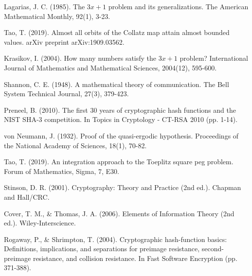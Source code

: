\begin{thebibliography}{99}

 Lagarias, J. C. (1985). The $3x + 1$ problem and its generalizations. The American Mathematical Monthly, 92(1), 3-23.

 Tao, T. (2019). Almost all orbits of the Collatz map attain almost bounded values. arXiv preprint arXiv:1909.03562.

 Krasikov, I. (2004). How many numbers satisfy the $3x + 1$ problem? International Journal of Mathematics and Mathematical Sciences, 2004(12), 595-600.

 Shannon, C. E. (1948). A mathematical theory of communication. The Bell System Technical Journal, 27(3), 379-423.

 Preneel, B. (2010). The first 30 years of cryptographic hash functions and the NIST SHA-3 competition. In Topics in Cryptology - CT-RSA 2010 (pp. 1-14).

 von Neumann, J. (1932). Proof of the quasi-ergodic hypothesis. Proceedings of the National Academy of Sciences, 18(1), 70-82.

 Tao, T. (2019). An integration approach to the Toeplitz square peg problem. Forum of Mathematics, Sigma, 7, E30.

 Stinson, D. R. (2001). Cryptography: Theory and Practice (2nd ed.). Chapman and Hall/CRC.

 Cover, T. M., & Thomas, J. A. (2006). Elements of Information Theory (2nd ed.). Wiley-Interscience.

 Rogaway, P., & Shrimpton, T. (2004). Cryptographic hash-function basics: Definitions, implications, and separations for preimage resistance, second-preimage resistance, and collision resistance. In Fast Software Encryption (pp. 371-388).

\end{thebibliography} 